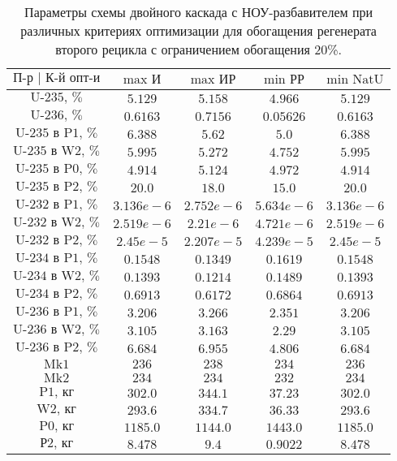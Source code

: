 \begin{table}
    \begin{tabular}{ccccc}
        $\text{П-р | К-й опт-и}$ & $\text{max И}$ & $\text{max ИР}$ & $\text{min РР}$ & $\text{min NatU}$\\ \hline
        $\text{U-235, \%}$ & $5.129$ & $5.158$ & $4.966$ & $5.129$\\ \hline
        $\text{U-236, \%}$ & $0.6163$ & $0.7156$ & $0.05626$ & $0.6163$\\ \hline
        $\text{U-235 в P1, \%}$ & $6.388$ & $5.62$ & $5.0$ & $6.388$\\ \hline
        $\text{U-235 в W2, \%}$ & $5.995$ & $5.272$ & $4.752$ & $5.995$\\ \hline
        $\text{U-235 в P0, \%}$ & $4.914$ & $5.124$ & $4.972$ & $4.914$\\ \hline
        $\text{U-235 в P2, \%}$ & $20.0$ & $18.0$ & $15.0$ & $20.0$\\ \hline
        $\text{U-232 в P1, \%}$ & $3.136e-6$ & $2.752e-6$ & $5.634e-6$ & $3.136e-6$\\ \hline
        $\text{U-232 в W2, \%}$ & $2.519e-6$ & $2.21e-6$ & $4.721e-6$ & $2.519e-6$\\ \hline
        $\text{U-232 в P2, \%}$ & $2.45e-5$ & $2.207e-5$ & $4.239e-5$ & $2.45e-5$\\ \hline
        $\text{U-234 в P1, \%}$ & $0.1548$ & $0.1349$ & $0.1619$ & $0.1548$\\ \hline
        $\text{U-234 в W2, \%}$ & $0.1393$ & $0.1214$ & $0.1489$ & $0.1393$\\ \hline
        $\text{U-234 в P2, \%}$ & $0.6913$ & $0.6172$ & $0.6864$ & $0.6913$\\ \hline
        $\text{U-236 в P1, \%}$ & $3.206$ & $3.266$ & $2.351$ & $3.206$\\ \hline
        $\text{U-236 в W2, \%}$ & $3.105$ & $3.163$ & $2.29$ & $3.105$\\ \hline
        $\text{U-236 в P2, \%}$ & $6.684$ & $6.955$ & $4.806$ & $6.684$\\ \hline
        $\text{Mk1}$ & $236$ & $238$ & $234$ & $236$\\ \hline
        $\text{Mk2}$ & $234$ & $234$ & $232$ & $234$\\ \hline
        $\text{P1, кг}$ & $302.0$ & $344.1$ & $37.23$ & $302.0$\\ \hline
        $\text{W2, кг}$ & $293.6$ & $334.7$ & $36.33$ & $293.6$\\ \hline
        $\text{P0, кг}$ & $1185.0$ & $1144.0$ & $1443.0$ & $1185.0$\\ \hline
        $\text{Р2, кг}$ & $8.478$ & $9.4$ & $0.9022$ & $8.478$
        \end{tabular}
\caption{Параметры схемы двойного каскада с НОУ-разбавителем при различных критериях оптимизации для обогащения регенерата второго рецикла с ограничением обогащения 20\%.{\label{2opt2_20}}}
\end{table}






